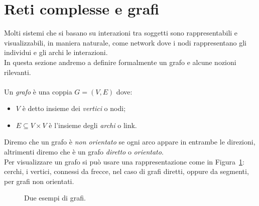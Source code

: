 \section{Reti complesse e grafi}
Molti sistemi che si basano su interazioni tra soggetti sono rappresentabili e visualizzabili, in maniera naturale, come network dove i nodi rappresentano gli individui e gli archi le interazioni.\\
In questa sezione andremo a definire formalmente un grafo e alcune nozioni rilevanti.\\ \\
Un \textit{grafo} \`e una coppia $G=(V,	E) $ dove:
\begin{itemize}
	\item $V$ \`e detto  insieme dei \textit{vertici} o nodi;
	\item $E\subseteq V \times V$ \`e l'insieme degli \textit{archi} o link.
\end{itemize}
Diremo che un grafo \`e \textit{non orientato} se ogni arco appare in entrambe le direzioni, altrimenti diremo che \`e un grafo \textit{diretto} o \textit{orientato}.\\
Per visualizzare un grafo si pu\`o usare una rappresentazione come in Figura~\ref{fig::esegrafi}: cerchi, i vertici, connessi da frecce, nel caso di grafi diretti, oppure da segmenti, per grafi non orientati. 
\begin{figure}[ht]
\centering
{}  \hfill
{}
\caption{Due esempi di grafi.}
\label{fig::esegrafi}
\end{figure}

